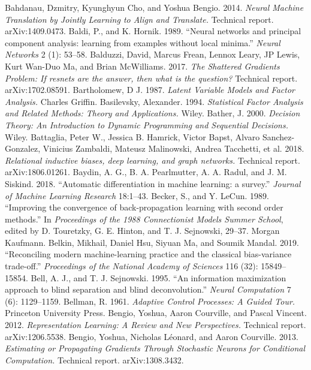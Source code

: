  Bahdanau, Dzmitry, Kyunghyun Cho, and Yoshua Bengio. 2014. \emph{Neural Machine Translation by Jointly Learning to Align and Translate.} Technical report. arXiv:1409.0473.
 Baldi, P., and K. Hornik. 1989. ``Neural networks and principal component analysis: learning from examples without local minima.'' \emph{Neural Networks} 2 (1): 53--58.
 Balduzzi, David, Marcus Frean, Lennox Leary, JP Lewis, Kurt Wan-Duo Ma, and Brian McWilliams. 2017. \emph{The Shattered Gradients Problem: If resnets are the answer, then what is the question?} Technical report. arXiv:1702.08591.
 Bartholomew, D J. 1987. \emph{Latent Variable Models and Factor Analysis.} Charles Griffin.
 Basilevsky, Alexander. 1994. \emph{Statistical Factor Analysis and Related Methods: Theory and Applications.} Wiley.
 Bather, J. 2000. \emph{Decision Theory: An Introduction to Dynamic Programming and Sequential Decisions.} Wiley.
 Battaglia, Peter W., Jessica B. Hamrick, Victor Bapst, Alvaro Sanchez-Gonzalez, Vinicius Zambaldi, Mateusz Malinowski, Andrea Tacchetti, et al. 2018. \emph{Relational inductive biases, deep learning, and graph networks.} Technical report. arXiv:1806.01261.
 Baydin, A. G., B. A. Pearlmutter, A. A. Radul, and J. M. Siskind. 2018. ``Automatic differentiation in machine learning: a survey.'' \emph{Journal of Machine Learning Research} 18:1--43.
 Becker, S., and Y. LeCun. 1989. ``Improving the convergence of back-propagation learning with second order methods.'' In \emph{Proceedings of the 1988 Connectionist Models Summer School}, edited by D. Touretzky, G. E. Hinton, and T. J. Sejnowski, 29--37. Morgan Kaufmann.
 Belkin, Mikhail, Daniel Hsu, Siyuan Ma, and Soumik Mandal. 2019. ``Reconciling modern machine-learning practice and the classical bias-variance trade-off.'' \emph{Proceedings of the National Academy of Sciences} 116 (32): 15849--15854.
 Bell, A. J., and T. J. Sejnowski. 1995. ``An information maximization approach to blind separation and blind deconvolution.'' \emph{Neural Computation} 7 (6): 1129--1159.
 Bellman, R. 1961. \emph{Adaptive Control Processes: A Guided Tour.} Princeton University Press.
 Bengio, Yoshua, Aaron Courville, and Pascal Vincent. 2012. \emph{Representation Learning: A Review and New Perspectives.} Technical report. arXiv:1206.5538.
 Bengio, Yoshua, Nicholas L\'eonard, and Aaron Courville. 2013. \emph{Estimating or Propagating Gradients Through Stochastic Neurons for Conditional Computation.} Technical report. arXiv:1308.3432.

